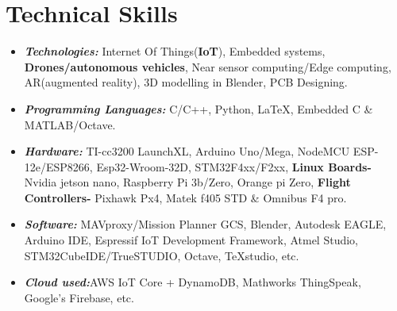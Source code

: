 \documentclass[10pt]{report}
\begin{document}
\section*{\color{BlueViolet}\faSellsy\hspace{1pt} Technical Skills} %
\begin{itemize}
\item \textbf{\emph{Technologies:}} Internet Of Things(\textbf{IoT}), Embedded systems, \textbf{Drones/autonomous vehicles}, Near sensor computing/Edge computing, AR(augmented reality), 3D modelling in Blender, PCB Designing. 
\item\textbf{\emph{Programming Languages:}} C/C++, Python, \LaTeX, Embedded C   \& MATLAB/Octave.
\item\textbf{\emph{Hardware:}} TI-cc3200 LaunchXL, Arduino Uno/Mega, NodeMCU ESP-12e/ESP8266, Esp32-Wroom-32D, STM32F4xx/F2xx,\textbf{ Linux Boards-} Nvidia jetson nano, Raspberry Pi 3b/Zero, Orange pi Zero,\textbf{ Flight Controllers-} Pixhawk Px4, Matek f405 STD \& Omnibus F4 pro.
\item\textbf{\emph{Software:}} MAVproxy/Mission Planner GCS, Blender, Autodesk EAGLE, Arduino IDE, Espressif IoT Development Framework, Atmel Studio, STM32CubeIDE/TrueSTUDIO, Octave, TeXstudio, etc.
\item\textbf{\emph{Cloud used:}}AWS IoT Core + DynamoDB, Mathworks ThingSpeak, Google's Firebase, etc.
\end{itemize}

\end{document}
